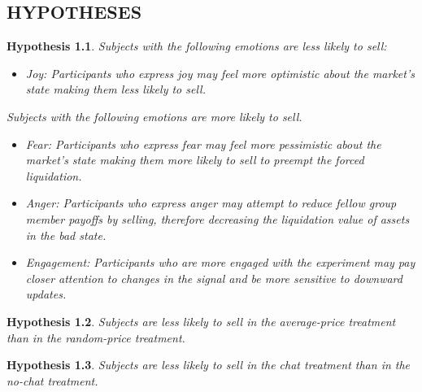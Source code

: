 \documentclass[thesis]{uathesis}
\newtheorem{hypothesis}{Hypothesis}
\begin{document}
\begin{body}
\chapter{HYPOTHESES}

\begin{hypothesis}\label{hyp:emotions}
    Subjects with the following emotions are less likely to sell:
    \begin{itemize}
        \item Joy: Participants who express joy may feel more optimistic about the market's state making them less likely to sell.
    \end{itemize}
    Subjects with the following emotions are more likely to sell.
    \begin{itemize}
        \item Fear: Participants who express fear may feel more pessimistic about the market's state making them more likely to sell to preempt the forced liquidation.
        \item Anger: Participants who express anger may attempt to reduce fellow group member payoffs by selling, therefore decreasing the liquidation value of assets in the bad state.
        \item Engagement: Participants who are more engaged with the experiment may pay closer attention to changes in the signal and be more sensitive to downward updates.
    \end{itemize}
\end{hypothesis}

\begin{hypothesis}\label{hyp:price_treatment}
    Subjects are less likely to sell in the average-price treatment than in the random-price treatment.
\end{hypothesis}

\begin{hypothesis}\label{hyp:chat_treatment}
    Subjects are less likely to sell in the chat treatment than in the no-chat treatment.
\end{hypothesis}


\end{body}
\end{document}
